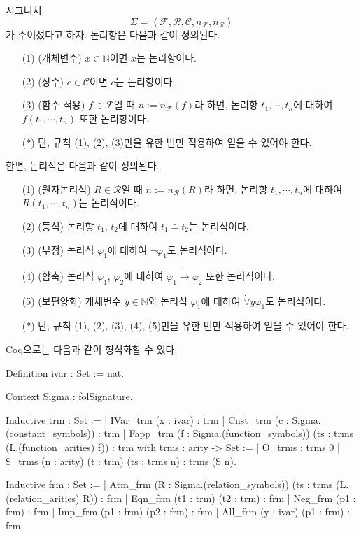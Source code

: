 \documentclass[12pt]{paper}
\begin{document}
시그니처 $$\Sigma = \left\langle \mathcal{F}, \mathcal{R}, \mathcal{C}, n_\mathcal{F} , n_\mathcal{R} \right\rangle$$가 주어졌다고 하자.
논리항은 다음과 같이 정의된다.
\begin{enumerate}
\item [(1)] (개체변수) $x \in \mathbb{N}$이면 $x$는 논리항이다.
\item [(2)] (상수) $c \in \mathcal{C}$이면 $c$는 논리항이다.
\item [(3)] (함수 적용) $f \in \mathcal{F}$일 때 $n := n_\mathcal{F} \left( f \right)$라 하면, 논리항 $t_1, \cdots , t_n$에 대하여 $f \left( t_1 , \cdots , t_n \right)$ 또한 논리항이다.
\item [($\ast$)] 단, 규칙 (1), (2), (3)만을 유한 번만 적용하여 얻을 수 있어야 한다.
\end{enumerate}
한편, 논리식은 다음과 같이 정의된다.
\begin{enumerate}
\item [(1)] (원자논리식) $R \in \mathcal{R}$일 때 $n := n_\mathcal{R} \left( R \right)$라 하면, 논리항 $t_1, \cdots , t_n$에 대하여 $R \left( t_1 , \cdots , t_n \right)$는 논리식이다.
\item [(2)] (등식) 논리항 $t_1$, $t_2$에 대하여 $t_1 \doteq t_2$는 논리식이다. 
\item [(3)] (부정) 논리식 $\varphi_1$에 대하여 $\dot\lnot \varphi_1$도 논리식이다.
\item [(4)] (함축) 논리식 $\varphi_1$, $\varphi_2$에 대하여 $\varphi_1 \dot\to \varphi_2$ 또한 논리식이다.
\item [(5)] (보편양화) 개체변수 $y \in \mathbb{N}$와 논리식 $\varphi_1$에 대하여 $\dot\forall y \varphi_1$도 논리식이다.
\item [($\ast$)] 단, 규칙 (1), (2), (3), (4), (5)만을 유한 번만 적용하여 얻을 수 있어야 한다.
\end{enumerate}
Coq으로는 다음과 같이 형식화할 수 있다.
\begin{coqcode}
Definition ivar : Set := nat.

Context {Sigma : folSignature}.

Inductive trm : Set :=
  | IVar_trm (x : ivar) : trm
  | Cnst_trm (c : Sigma.(constant_symbols)) : trm
  | Fapp_trm (f : Sigma.(function_symbols)) (ts : trms (L.(function_arities) f)) : trm
with trms : arity -> Set :=
  | O_trms : trms 0
  | S_trms (n : arity) (t : trm) (ts : trms n) : trms (S n).

Inductive frm : Set :=
  | Atm_frm (R : Sigma.(relation_symbols)) (ts : trms (L.(relation_arities) R)) : frm
  | Eqn_frm (t1 : trm) (t2 : trm) : frm
  | Neg_frm (p1 : frm) : frm
  | Imp_frm (p1 : frm) (p2 : frm) : frm
  | All_frm (y : ivar) (p1 : frm) : frm.
\end{coqcode}
\end{document}
